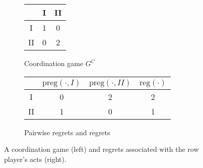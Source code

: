 \documentclass[fleqn,reqno,12pt]{article}
\theoremstyle{Satz}
\theoremstyle{Bsp}
\begin{document}
\begin{figure}

  \begin{subfigure}[b]{0.3\textwidth}
    \centering
    \begin{tabular}{ccc}
      \toprule
      & I & II \\
      \midrule
      I & 1 & 0 \\
      II & 0 & 2\\
      \bottomrule
    \end{tabular}
    \caption{Coordination game $G^C$}
    \label{coordgame1}
  \end{subfigure}
  \hspace{1cm}
  \begin{subfigure}[b]{0.5\textwidth}
    \centering
    \begin{tabular}{ccc|c}
      \toprule
      & $\text{preg}( \cdot, I)$ & $\text{preg}(\cdot, II)$ & $\text{reg}(\cdot)$ \\
      \midrule
      I  & 0 & 2 & 2 \\ 
      II & 1 & 0 & 1\\
      \bottomrule
    \end{tabular}
    \caption{Pairwise regrets and regrets}
    \label{coordgame1reg}
  \end{subfigure}
  \caption{A coordination game (left) and regrets associated with the row player's acts (right).}
    \label{coordgame1mainFig}
\end{figure}
\end{document}
